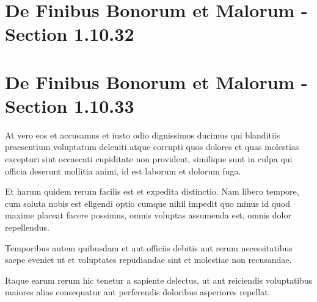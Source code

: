 \section{De Finibus Bonorum et Malorum - Section 1.10.32}

\section{De Finibus Bonorum et Malorum - Section 1.10.33}

At vero eos et accusamus et iusto odio dignissimos ducimus qui blanditiis praesentium voluptatum deleniti atque corrupti quos dolores et quas molestias excepturi sint occaecati cupiditate non provident, similique sunt in culpa qui officia deserunt mollitia animi, id est laborum et dolorum fuga.  

Et harum quidem rerum facilis est et expedita distinctio. Nam libero tempore, cum soluta nobis est eligendi optio cumque nihil impedit quo minus id quod maxime placeat facere possimus, omnis voluptas assumenda est, omnis dolor repellendus.  

Temporibus autem quibusdam et aut officiis debitis aut rerum necessitatibus saepe eveniet ut et voluptates repudiandae sint et molestiae non recusandae.  

Itaque earum rerum hic tenetur a sapiente delectus, ut aut reiciendis voluptatibus maiores alias consequatur aut perferendis doloribus asperiores repellat.
